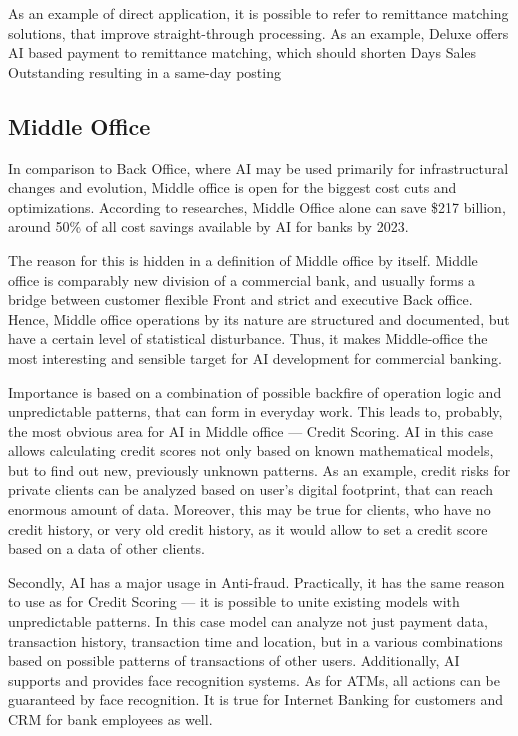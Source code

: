 As an example of direct application, it is possible to refer to remittance matching solutions, that improve straight-through processing.
As an example, Deluxe offers AI based payment to remittance matching, which should shorten Days Sales Outstanding resulting in a same-day posting
\cite{deluxe_ai_remittance}


\subsection*{Middle Office}

In comparison to Back Office, where AI may be used primarily for infrastructural changes and evolution, Middle office is open for the biggest cost cuts and optimizations.
According to researches, Middle Office alone can save \$217 billion, around 50\% of all cost savings available by AI for banks by 2023.
\cite{trillion_opportunity}

The reason for this is hidden in a definition of Middle office by itself.
Middle office is comparably new division of a commercial bank, and usually forms a bridge between customer flexible Front and strict and executive Back office.
Hence, Middle office operations by its nature are structured and documented, but have a certain level of statistical disturbance.
Thus, it makes Middle-office the most interesting and sensible target for AI development for commercial banking.

Importance is based on a combination of possible backfire of operation logic and unpredictable patterns, that can form in everyday work.
This leads to, probably, the most obvious area for AI in Middle office — Credit Scoring.
AI in this case allows calculating credit scores not only based on known mathematical models, but to find out new, previously unknown patterns.
As an example, credit risks for private clients can be analyzed based on user's digital footprint, that can reach enormous amount of data.
Moreover, this may be true for clients, who have no credit history, or very old credit history, as it would allow to set a credit score based on a data of other clients.

Secondly, AI has a major usage in Anti-fraud.
Practically, it has the same reason to use as for Credit Scoring — it is possible to unite existing models with unpredictable patterns.
In this case model can analyze not just payment data, transaction history, transaction time and location, but in a various combinations based on possible patterns of transactions of other users.
Additionally, AI supports and provides face recognition systems.
As for ATMs, all actions can be guaranteed by face recognition.
It is true for Internet Banking for customers and CRM for bank employees as well.

